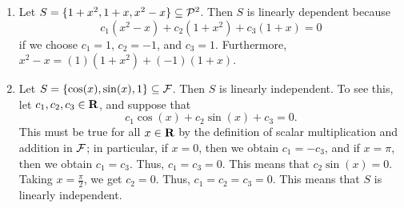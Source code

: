 \documentclass{homework}
\begin{document}
	\question
	\begin{enumerate}
		\item Let $S = \{1 + x^2, 1+x, x^2 - x\}\subseteq \mathcal{P}^2$. Then $S$ is linearly dependent because
		\begin{equation*}
			c_1(x^2-x) + c_2(1+x^2) + c_3(1+x) = 0
		\end{equation*}
		if we choose $c_1 = 1$, $c_2 = -1$, and $c_3 = 1$. Furthermore, $x^2-x = (1)(1+x^2) + (-1)(1+x)$.
		
		\item Let $S = \{\cos(x), \sin(x), 1\} \subseteq \mathcal{F}$. Then $S$ is linearly independent. To see this, let $c_1,c_2,c_3 \in \textnormal{\bf R}$, and suppose that
		\begin{equation*}
			c_1\cos(x) + c_2\sin(x) + c_3 = 0.
		\end{equation*}
		This must be true for all $x\in \textnormal{\bf R}$ by the definition of scalar multiplication and addition in $\mathcal{F}$; in particular, if $x = 0$, then we obtain $c_1 = -c_3$, and if $x =\pi$, then we obtain $c_1 = c_3$. Thus, $c_1 = c_3 = 0$. This means that $c_2\sin(x) = 0$. Taking $x = \frac{\pi}{2}$, we get $c_2 = 0$. Thus, $c_1 =c_2=c_3 = 0$. This means that $S$ is linearly independent.
	\end{enumerate}
	
\end{document}
